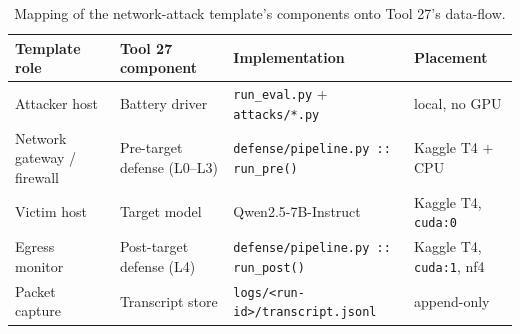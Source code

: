 \documentclass[11pt,a4paper]{article}
\begin{document}
\begin{table}[!ht]
\centering\small
\begin{tabular}{@{}p{3.1cm}p{3.1cm}p{4.0cm}p{3.0cm}@{}}
\toprule
\textbf{Template role} & \textbf{Tool 27 component} & \textbf{Implementation} & \textbf{Placement} \\
\midrule
Attacker host & Battery driver & \texttt{run\_eval.py} + \texttt{attacks/*.py} & local, no GPU \\
Network gateway / firewall & Pre-target defense (L0--L3) & \texttt{defense/pipeline.py :: run\_pre()} & Kaggle T4 + CPU \\
Victim host & Target model & Qwen2.5-7B-Instruct & Kaggle T4, \texttt{cuda:0} \\
Egress monitor & Post-target defense (L4) & \texttt{defense/pipeline.py :: run\_post()} & Kaggle T4, \texttt{cuda:1}, nf4 \\
Packet capture & Transcript store & \texttt{logs/\textless run-id\textgreater/}\newline\texttt{transcript.jsonl} & append-only \\
\bottomrule
\end{tabular}
\caption{Mapping of the network-attack template's components onto Tool 27's data-flow.}
\end{table}
\end{document}
